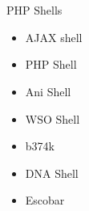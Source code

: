 %
\begin{frame}
\frametitle{\\}
\vspace{2pt}
%
{\LARGE PHP Shells \newline}
\begin{itemize}
  \item AJAX shell
  \item PHP Shell
  \item Ani Shell
  \item WSO Shell
  \item b374k
  \item DNA Shell
  \item Escobar
\end{itemize}
\end{frame}
